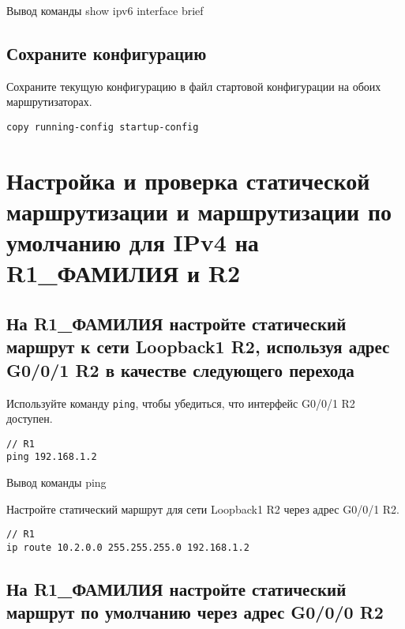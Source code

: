 \begin{image}
	\caption{Вывод команды show ipv6 interface brief}
\end{image}

\subsection{Сохраните конфигурацию}

Сохраните текущую конфигурацию в файл стартовой конфигурации
на обоих маршрутизаторах.

\begin{verbatim}
copy running-config startup-config
\end{verbatim}

\section{Настройка и проверка статической маршрутизации и
	маршрутизации по умолчанию для IPv4 на R1\_ФАМИЛИЯ и R2}

\subsection{На R1\_ФАМИЛИЯ настройте статический маршрут к сети Loopback1 R2,
	используя адрес G0/0/1 R2 в качестве следующего перехода}

Используйте команду \texttt{ping}, чтобы убедиться,
что интерфейс G0/0/1 R2 доступен.

\begin{verbatim}
// R1
ping 192.168.1.2
\end{verbatim}

\begin{image}
	\caption{Вывод команды ping}
\end{image}

Настройте статический маршрут для сети Loopback1 R2 через адрес G0/0/1 R2.

\begin{verbatim}
// R1
ip route 10.2.0.0 255.255.255.0 192.168.1.2
\end{verbatim}

\subsection{На R1\_ФАМИЛИЯ настройте статический маршрут
	по умолчанию через адрес G0/0/0 R2}

